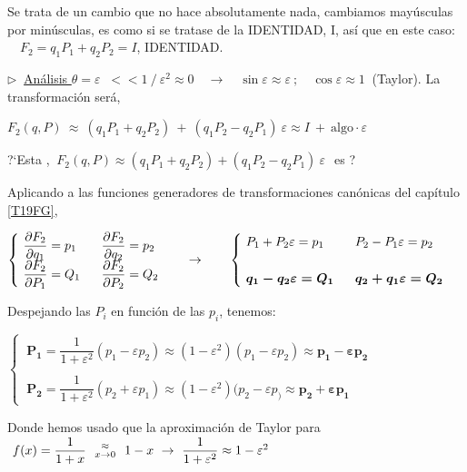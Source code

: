 Se trata de un cambio que no hace absolutamente nada, cambiamos mayúsculas por minúsculas, es como si se tratase de la IDENTIDAD, I, así que en este caso: 
$\quad F_2=q_1P_1+q_2P_2=I$, IDENTIDAD.

\vspace{5mm} $\triangleright\ $ \underline{Análisis $\theta =\varepsilon$} $\  << 1 \ / \ \varepsilon^2\approx 0 \quad \to \quad \sin \varepsilon \approx \varepsilon \ ;\quad \cos \varepsilon \approx 1\ $ \textcolor{gris}{(Taylor)}. La transformación será,

$F_2(q,P) \ \approx \ (q_1P_1+q_2P_2) \ + \ (q_1P_2-q_2P_1)\ \varepsilon \approx I \ + \ \text{algo} \cdot \varepsilon$ 


\vspace{5mm} ?`Esta , $\ F_2(q,P)\approx (q_1P_1+q_2P_2)  +  (q_1P_2-q_2P_1)\ \varepsilon\, \ $ es ?

Aplicando a las funciones generadores de transformaciones canónicas del capítulo \ref{T19FG},

$\begin{cases}
\ \displaystyle \pdv{F_2}{q_1}=p_1 & \ \ \displaystyle \pdv{F_2}{q_2}=p_2 \\
\ \displaystyle \pdv{F_2	}{P_1}=Q_1 & \ \ \displaystyle \pdv{F_2}{P_2}=Q_2
\end{cases} \qquad \to \qquad 
\begin{cases}
\ P_1+P_2 \varepsilon =p_1 & \ \ P_2-P_1\varepsilon =p_2	 \\ \\
\ \boldsymbol{ q_1-q_2 \varepsilon =Q_1} & \ \ \boldsymbol{q_2+q_1 \varepsilon =Q_2}
\end{cases}$

Despejando las $P_i$ en función de las $p_i$, tenemos: 

$\begin{cases} 
\ \boldsymbol{P_1}=\dfrac 1{1+\varepsilon^2} (p_1-\varepsilon p_2) \approx (1-\varepsilon^2)(p_1-\varepsilon p_2) \approx \boldsymbol{p_1-\varepsilon p_2} \\ \\
\ \boldsymbol{P_2}=\dfrac 1{1+\varepsilon^2} (p_2+\varepsilon p_1) \approx (1-\varepsilon^2)(p_2-\varepsilon p_) \approx \boldsymbol{p_2+\varepsilon p_1}
\end{cases}$

Donde hemos usado que la aproximación de Taylor para $\ f(x)=\dfrac {1}{1+x} \ \ \begin{matrix}  _\approx \\ \begin{tiny}^{x\to 0 }\end{tiny} \end{matrix} \ \ 1-x \ \to \ \dfrac 1{1+\varepsilon^2} \approx 1-\varepsilon^2$

